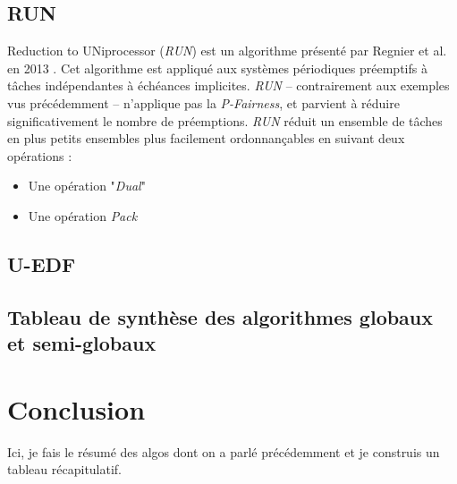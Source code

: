 \documentclass[11pt,a4paper,oneside]{report}
\begin{document}
\subsection{RUN}
Reduction to UNiprocessor (\textit{RUN}) est un algorithme présenté par Regnier et al. en 2013 \cite{regnier_multiprocessor_2013}. 
Cet algorithme est appliqué aux systèmes périodiques préemptifs à tâches indépendantes à 
échéances implicites. \textit{RUN} -- contrairement aux exemples vus précédemment -- n'applique pas 
la \textit{P-Fairness}, et parvient à réduire significativement le nombre de préemptions. 
\textit{RUN} réduit un ensemble de tâches en plus petits ensembles plus facilement ordonnançables 
en suivant deux opérations :\\
\begin{itemize}
    \item Une opération "\textit{Dual}"
    \item Une opération \textit{Pack}
\end{itemize}



\subsection{U-EDF}

\subsection{Tableau de synthèse des algorithmes globaux et semi-globaux}

\section{Conclusion}

Ici, je fais le résumé des algos dont on a parlé précédemment et je construis un tableau récapitulatif. 



\end{document}
